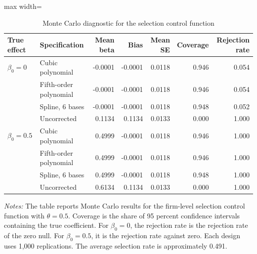 ﻿\documentclass[12pt]{article}
\newenvironment{fittabular}[1]{\begin{adjustbox}{max width=\textwidth}\begin{tabular}{#1}}{\end{tabular}\end{adjustbox}}
\begin{document}
\begin{table}[htbp]
\centering
\caption{Monte Carlo diagnostic for the selection control function}
\label{tab:mc_selection}
\small
\setlength{\tabcolsep}{5pt}
\begin{fittabular}{llrrrrr}
\toprule
True effect & Specification & Mean beta & Bias & Mean SE & Coverage & Rejection rate \\
\midrule
$\beta_0=0$ & Cubic polynomial & -0.0001 & -0.0001 & 0.0118 & 0.946 & 0.054 \\
& Fifth-order polynomial & -0.0001 & -0.0001 & 0.0118 & 0.946 & 0.054 \\
& Spline, 6 bases & -0.0001 & -0.0001 & 0.0118 & 0.948 & 0.052 \\
& Uncorrected & 0.1134 & 0.1134 & 0.0133 & 0.000 & 1.000 \\
\addlinespace
$\beta_0=0.5$ & Cubic polynomial & 0.4999 & -0.0001 & 0.0118 & 0.946 & 1.000 \\
& Fifth-order polynomial & 0.4999 & -0.0001 & 0.0118 & 0.946 & 1.000 \\
& Spline, 6 bases & 0.4999 & -0.0001 & 0.0118 & 0.948 & 1.000 \\
& Uncorrected & 0.6134 & 0.1134 & 0.0133 & 0.000 & 1.000 \\
\bottomrule
\end{fittabular}
\begin{minipage}{0.88\textwidth}
\footnotesize
\vspace{0.5em}
\emph{Notes:} The table reports Monte Carlo results for the firm-level selection control function with $\theta=0.5$. Coverage is the share of 95 percent confidence intervals containing the true coefficient. For $\beta_0=0$, the rejection rate is the rejection rate of the zero null. For $\beta_0=0.5$, it is the rejection rate against zero. Each design uses 1,000 replications. The average selection rate is approximately 0.491.
\end{minipage}
\end{table}
\end{document}
